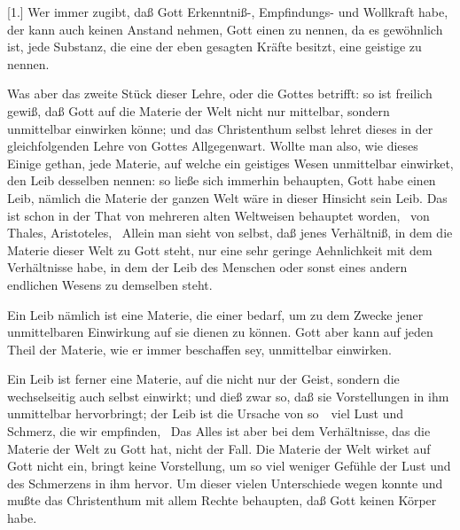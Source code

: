 \begin{aufza}
\item[{[1.]}] Wer immer zugibt, daß Gott Erkenntniß-, Empfindungs- und Wollkraft habe, der kann auch keinen Anstand nehmen, Gott einen  zu nennen, da es gewöhnlich ist, jede Substanz, die eine der eben gesagten Kräfte besitzt, eine geistige zu nennen.
\item Was aber das zweite Stück dieser Lehre, oder die  Gottes betrifft: so ist freilich gewiß, daß Gott auf die Materie der Welt nicht nur mittelbar, sondern unmittelbar einwirken könne; und das Christenthum selbst lehret dieses in der gleichfolgenden Lehre von Gottes Allgegenwart. Wollte man also, wie dieses Einige gethan, jede Materie, auf welche ein geistiges Wesen unmittelbar einwirket, den Leib desselben nennen: so ließe sich immerhin behaupten, Gott habe einen Leib, nämlich die Materie der ganzen Welt wäre in dieser Hinsicht sein Leib. Das ist schon in der That von mehreren alten Weltweisen behauptet worden, \zB\ von Thales, Aristoteles, \uA\ Allein man sieht von selbst, daß jenes Verhältniß, in dem die Materie dieser Welt zu Gott steht, nur eine sehr geringe Aehnlichkeit mit dem Verhältnisse habe, in dem der Leib des Menschen oder sonst eines andern endlichen Wesens zu demselben steht.
\begin{aufzb}
\item Ein Leib nämlich ist eine Materie, die einer  bedarf, um zu dem Zwecke jener unmittelbaren Einwirkung auf sie dienen zu können. Gott aber kann auf jeden Theil der Materie, wie er immer beschaffen sey, unmittelbar einwirken.
\item Ein Leib ist ferner eine Materie, auf die nicht nur der Geist, sondern die wechselseitig auch  selbst einwirkt; und dieß zwar so, daß sie Vorstellungen in ihm unmittelbar hervorbringt; der Leib ist die Ursache von so~\ viel Lust und Schmerz, die wir empfinden, \usw\ Das Alles ist aber bei dem Verhältnisse, das die Materie der Welt zu Gott hat, nicht der Fall. Die Materie der Welt wirket auf Gott nicht ein, bringt keine Vorstellung, um so viel weniger Gefühle der Lust und des Schmerzens in ihm hervor. Um dieser vielen Unterschiede wegen konnte und mußte das Christenthum mit allem Rechte behaupten, daß Gott keinen Körper habe.
\end{aufzb}
\end{aufza}

